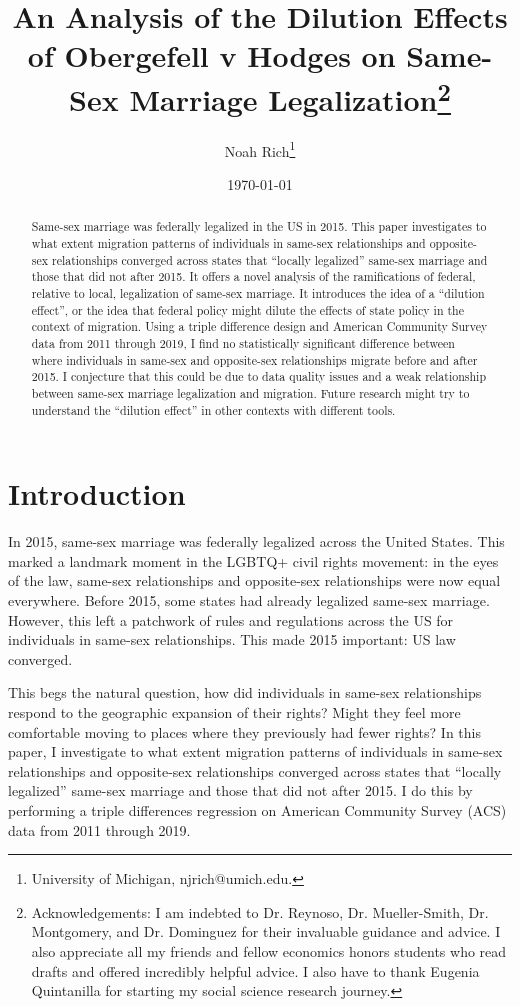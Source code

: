 \documentclass[12pt,letterpaper]{article}
\title{An Analysis of the Dilution Effects of Obergefell v Hodges on Same-Sex Marriage Legalization\footnote{Acknowledgements: I am indebted to Dr. Reynoso, Dr. Mueller-Smith, Dr. Montgomery, and Dr. Dominguez for their invaluable guidance and advice. I also appreciate all my friends and fellow economics honors students who read drafts and offered incredibly helpful advice. I also have to thank Eugenia Quintanilla for starting my social science research journey.}}
\author{Noah Rich\footnote{University of Michigan, njrich@umich.edu.}}
\date{\today}
\begin{document}
\maketitle


\begin{abstract}
Same-sex marriage was federally legalized in the US in 2015. This paper investigates to what extent migration patterns of individuals in same-sex relationships and opposite-sex relationships converged across states that “locally legalized” same-sex marriage and those that did not after 2015. It offers a novel analysis of the ramifications of federal, relative to local, legalization of same-sex marriage. It introduces the idea of a “dilution effect”, or the idea that federal policy might dilute the effects of state policy in the context of migration. Using a triple difference design and American Community Survey data from 2011 through 2019, I find no statistically significant difference between where individuals in same-sex and opposite-sex relationships migrate before and after 2015. I conjecture that this could be due to data quality issues and a weak relationship between same-sex marriage legalization and migration. Future research might try to understand the “dilution effect” in other contexts with different tools.
\end{abstract}

\newpage

\section{Introduction}

In 2015, same-sex marriage was federally legalized across the United States. This marked a landmark moment in the LGBTQ+ civil rights movement: in the eyes of the law, same-sex relationships and opposite-sex relationships were now equal everywhere. Before 2015, some states had already legalized same-sex marriage. However, this left a patchwork of rules and regulations across the US for individuals in same-sex relationships. This made 2015 important: US law converged.

This begs the natural question, how did individuals in same-sex relationships respond to the geographic expansion of their rights? Might they feel more comfortable moving to places where they previously had fewer rights? In this paper, I investigate to what extent migration patterns of individuals in same-sex relationships and opposite-sex relationships converged across states that “locally legalized” same-sex marriage and those that did not after 2015. I do this by performing a triple differences regression on American Community Survey (ACS) data from 2011 through 2019.
\end{document}
